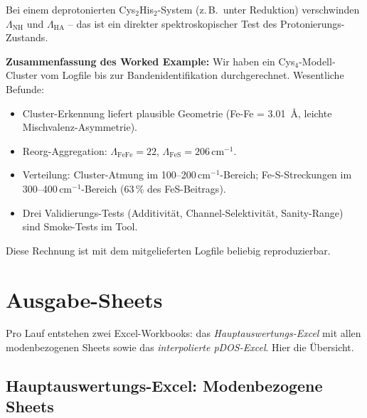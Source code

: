 \documentclass[11pt,a4paper,twoside]{article}
\providecommand{\angstrom}{\text{\AA}}    %
\theoremstyle{remark}
\begin{document}
Bei einem deprotonierten Cys$_2$His$_2$-System (z.\,B.\ unter
Reduktion) verschwinden $\Lambda_\text{NH}$ und $\Lambda_\text{HA}$ --
das ist ein direkter spektroskopischer Test des
Protonierungs-Zustands.

\begin{infobox}
\textbf{Zusammenfassung des Worked Example:} Wir haben ein
Cys$_4$-Modell-Cluster vom Logfile bis zur Bandenidentifikation
durchgerechnet. Wesentliche Befunde:
\begin{itemize}\setlength{\itemsep}{0pt}
  \item Cluster-Erkennung liefert plausible Geometrie (Fe-Fe = 3.01\,
        $\angstrom$, leichte Mischvalenz-Asymmetrie).
  \item Reorg-Aggregation: $\Lambda_\text{FeFe} = 22$, $\Lambda_\text{FeS}
        = 206$\,cm$^{-1}$.
  \item Verteilung: Cluster-Atmung im 100--200\,cm$^{-1}$-Bereich;
        Fe-S-Streckungen im 300--400\,cm$^{-1}$-Bereich (63\,\%
        des FeS-Beitrags).
  \item Drei Validierungs-Tests (Additivit\"at, Channel-Selektivit\"at,
        Sanity-Range) sind Smoke-Tests im Tool.
\end{itemize}
Diese Rechnung ist mit dem mitgelieferten Logfile beliebig
reproduzierbar.
\end{infobox}


\section{Ausgabe-Sheets}
\label{sec:ausgabe}

Pro Lauf entstehen zwei Excel-Workbooks: das \emph{Hauptauswertungs-Excel}
mit allen modenbezogenen Sheets sowie das \emph{interpolierte pDOS-Excel}.
Hier die \"Ubersicht.

\subsection{Hauptauswertungs-Excel: Modenbezogene Sheets}
\end{document}
